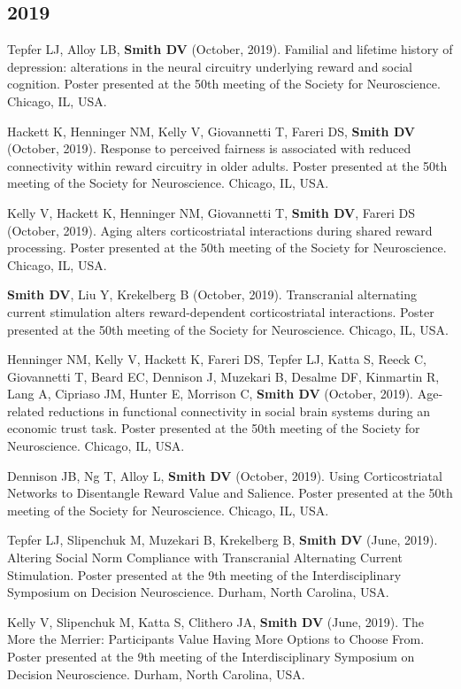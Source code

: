 \documentclass[11pt, letterpaper]{article}
\begin{document}
\subsection*{2019}
\begin{hangparas}{.5in}{1}

Tepfer LJ, Alloy LB, \textbf{Smith DV} (October, 2019). Familial and lifetime history of depression: alterations in the neural circuitry underlying reward and social cognition. Poster presented at the 50th meeting of the Society for Neuroscience. Chicago, IL, USA.

Hackett K, Henninger NM, Kelly V, Giovannetti T, Fareri DS, \textbf{Smith DV} (October, 2019). Response to perceived fairness is associated with reduced connectivity within reward circuitry in older adults. Poster presented at the 50th meeting of the Society for Neuroscience. Chicago, IL, USA.

Kelly V, Hackett K, Henninger NM, Giovannetti T, \textbf{Smith DV}, Fareri DS (October, 2019). Aging alters corticostriatal interactions during shared reward processing. Poster presented at the 50th meeting of the Society for Neuroscience. Chicago, IL, USA.

\textbf{Smith DV}, Liu Y, Krekelberg B (October, 2019). Transcranial alternating current stimulation alters reward-dependent corticostriatal interactions. Poster presented at the 50th meeting of the Society for Neuroscience. Chicago, IL, USA.

Henninger NM, Kelly V, Hackett K, Fareri DS, Tepfer LJ, Katta S, Reeck C, Giovannetti T, Beard EC, Dennison J, Muzekari B, Desalme DF, Kinmartin R, Lang A, Cipriaso JM, Hunter E, Morrison C, \textbf{Smith DV} (October, 2019). Age‐related reductions in functional connectivity in social brain systems during an economic trust task. Poster presented at the 50th meeting of the Society for Neuroscience. Chicago, IL, USA.

Dennison JB, Ng T, Alloy L, \textbf{Smith DV} (October, 2019). Using Corticostriatal Networks to Disentangle Reward Value and Salience. Poster presented at the 50th meeting of the Society for Neuroscience. Chicago, IL, USA.

Tepfer LJ, Slipenchuk M, Muzekari B, Krekelberg B, \textbf{Smith DV} (June, 2019). Altering Social Norm Compliance with Transcranial Alternating Current Stimulation. Poster presented at the 9th meeting of the Interdisciplinary Symposium on Decision Neuroscience. Durham, North Carolina, USA.

Kelly V, Slipenchuk M, Katta S, Clithero JA, \textbf{Smith DV} (June, 2019). The More the Merrier: Participants Value Having More Options to Choose From. Poster presented at the 9th meeting of the Interdisciplinary Symposium on Decision Neuroscience. Durham, North Carolina, USA.


\end{hangparas}
\end{document}

